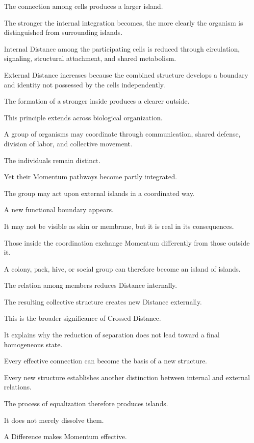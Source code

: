 The connection among cells produces a larger island.

The stronger the internal integration becomes, the more clearly the organism is distinguished from surrounding islands.

Internal Distance among the participating cells is reduced through circulation, signaling, structural attachment, and shared metabolism.

External Distance increases because the combined structure develops a boundary and identity not possessed by the cells independently.

The formation of a stronger inside produces a clearer outside.

This principle extends across biological organization.

A group of organisms may coordinate through communication, shared defense, division of labor, and collective movement.

The individuals remain distinct.

Yet their Momentum pathways become partly integrated.

The group may act upon external islands in a coordinated way.

A new functional boundary appears.

It may not be visible as skin or membrane, but it is real in its consequences.

Those inside the coordination exchange Momentum differently from those outside it.

A colony, pack, hive, or social group can therefore become an island of islands.

The relation among members reduces Distance internally.

The resulting collective structure creates new Distance externally.

This is the broader significance of Crossed Distance.

It explains why the reduction of separation does not lead toward a final homogeneous state.

Every effective connection can become the basis of a new structure.

Every new structure establishes another distinction between internal and external relations.

The process of equalization therefore produces islands.

It does not merely dissolve them.

A Difference makes Momentum effective.

